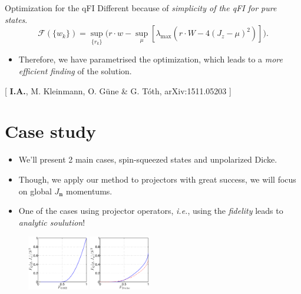 \documentclass{beamer}
\newcommand{\citate}[1]{\footnotesize{\color{gray}[ #1 ]}

	}
\begin{document}
		\begin{frame}
			\begin{block}
				{Optimization for the qFI}
				Different because of \emph{\color{blue} simplicity of the qFI for pure states}.
				{\small
				\[
				\mathcal{F}(\{w_k\}) = \sup_{\{r_k\}} \big( r\cdot w - \sup_{\mu} [ \lambda_{\max} ( r\cdot W - 4(J_z-\mu)^2 ) ] \big).
				\]}
			\end{block}
			\begin{itemize}
				\item Therefore, we have parametrised the optimization, which leads to a \emph{more efficient finding} of the solution.

			\end{itemize}

			\citate{{\bf I.A.}, M. Kleinmann, O. G\"une \& G. T\'oth, arXiv:1511.05203}

		\end{frame}

\section{Case study}

		\begin{frame}
			\tableofcontents[currentsection]

		\end{frame}

		\begin{frame}
			\begin{itemize}
				\item We'll present 2 main cases, spin-squeezed states and unpolarized Dicke.
				\item Though, we apply our method to projectors with great success, we will focus on global $J_{\mathbf n}$ momentums.
				\item One of the cases using projector operators, {\it i.e.}, using the \emph{fidelity} leads to \emph{\color{blue}analytic soulution}!
			\end{itemize}
			\begin{figure}
				\includegraphics[height=90px]{img/lb-ghzfidelity.pdf}
				\hspace{20px}
				\includegraphics[height=90px]{img/lb-dickefidelity}
			\end{figure}

		\end{frame}
\end{document}
